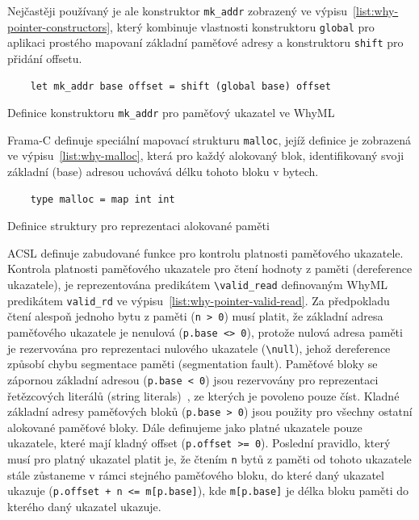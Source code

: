 Nejčastěji používaný je ale konstruktor \texttt{mk\_addr} zobrazený ve výpisu~\ref{list:why-pointer-constructors},
který kombinuje vlastnosti konstruktoru \texttt{global} pro aplikaci prostého mapovaní
základní paměťové adresy a konstruktoru \texttt{shift} pro přidání offsetu.


\begin{listing}[H]
    \begin{verbatim}
    let mk_addr base offset = shift (global base) offset
    \end{verbatim}
    \caption{Definice konstruktoru \texttt{mk\_addr} pro paměťový ukazatel ve WhyML}
    \label{list:why-pointer-constructor-mk-addr}
\end{listing}

Frama\mbox{-}C definuje speciální mapovací strukturu \texttt{malloc},
jejíž definice je zobrazená ve výpisu~\ref{list:why-malloc},
která pro každý alokovaný blok, identifikovaný svoji základní (base) adresou
uchovává délku tohoto bloku v bytech.

\begin{listing}[H]
    \begin{verbatim}
    type malloc = map int int
    \end{verbatim}
    \caption{Definice struktury pro reprezentaci alokované paměti}
    \label{list:why-malloc}
\end{listing}

ACSL definuje zabudované funkce pro kontrolu platnosti paměťového ukazatele.
Kontrola platnosti paměťového ukazatele pro čtení hodnoty z paměti (dereference ukazatele),
je reprezentována predikátem \texttt{\textbackslash valid\_read}
definovaným WhyML predikátem \texttt{valid\_rd} ve výpisu~\ref{list:why-pointer-valid-read}.
Za předpokladu čtení alespoň jednoho bytu z paměti (\texttt{n > 0}) musí platit,
že základní adresa paměťového ukazatele je nenulová (\texttt{p.base <> 0}),
protože nulová adresa paměti je rezervována pro reprezentaci nulového ukazatele (\texttt{\textbackslash null}),
jehož dereference způsobí chybu segmentace paměti (segmentation fault).
Paměťové bloky se zápornou základní adresou (\texttt{p.base < 0}) jsou rezervovány pro reprezentaci
řetězcových literálů (string literals)~\cite{ACSLSpec}, ze kterých je povoleno pouze číst.
Kladné základní adresy paměťových bloků (\texttt{p.base > 0}) jsou použity pro
všechny ostatní alokované paměťové bloky.
Dále definujeme jako platné ukazatele pouze ukazatele, které mají kladný offset (\texttt{p.offset >= 0}).
Poslední pravidlo, který musí pro platný ukazatel platit je,
že čtením \texttt{n} bytů z paměti od tohoto ukazatele stále zůstaneme v rámci stejného paměťového bloku,
do které daný ukazatel ukazuje (\texttt{p.offset + n <= m[p.base]}),
kde \texttt{m[p.base]} je délka bloku paměti do kterého daný ukazatel ukazuje.

